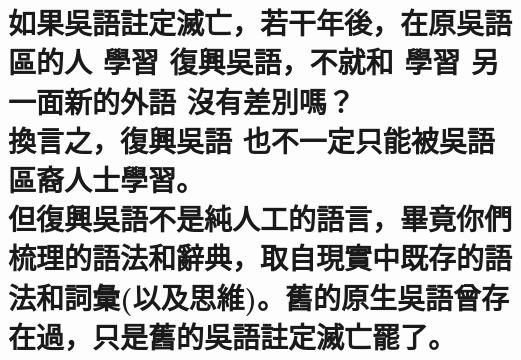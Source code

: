 %

\chapter[如果吳語註定滅亡，若干年後，在原吳語區的人 學習 復興吳語，不就和 學習 另一面新的外語 沒有差別嗎？ 換言之，復興吳語 也不一定只能被吳語區裔人士學習。 但復興吳語不是純人工的語言，畢竟你們梳理的語法和辭典，取自現實中既存的語法和詞彙(以及思維)。舊的原生吳語曾存在過，只是舊的吳語註定滅亡罷了。]{如果吳語註定滅亡，若干年後，在原吳語區的人 學習 復興吳語，不就和 學習 另一面新的外語 沒有差別嗎？ \\[0.35em] 換言之，復興吳語 也不一定只能被吳語區裔人士學習。 \\[0.35em] 但復興吳語不是純人工的語言，畢竟你們梳理的語法和辭典，取自現實中既存的語法和詞彙(以及思維)。舊的原生吳語曾存在過，只是舊的吳語註定滅亡罷了。}

